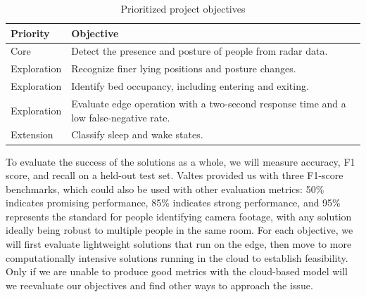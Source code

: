 \vspace{0.5em}
\begingroup
\setlength{\intextsep}{0.4em}
\begin{table}[H]
    \centering
    \captionsetup{skip=4pt,font=small}
    \caption{Prioritized project objectives}
    \footnotesize
    \renewcommand{\arraystretch}{1.05}
    \setlength{\tabcolsep}{5pt}
    \begin{tabularx}{\textwidth}{|>{\raggedright\arraybackslash}p{2.5cm}|>{\raggedright\arraybackslash}X|}
        \hline
        \textbf{Priority} & \textbf{Objective} \\ \hline
        Core & Detect the presence and posture of people from radar data. \\ \hline
        Exploration & Recognize finer lying positions and posture changes. \\ \hline
        Exploration & Identify bed occupancy, including entering and exiting. \\ \hline
        Exploration & Evaluate edge operation with a two-second response time and a low false-negative rate. \\ \hline
        Extension & Classify sleep and wake states. \\ \hline
    \end{tabularx}
\end{table}
\endgroup

To evaluate the success of the solutions as a whole, we will measure accuracy, F1 score, and recall on a held-out test set. Valtes provided us with three F1-score benchmarks, which could also be used with other evaluation metrics: 50\% indicates promising performance, 85\% indicates strong performance, and 95\% represents the standard for people identifying camera footage, with any solution ideally being robust to multiple people in the same room. For each objective, we will first evaluate lightweight solutions that run on the edge, then move to more computationally intensive solutions running in the cloud to establish feasibility. Only if we are unable to produce good metrics with the cloud-based model will we reevaluate our objectives and find other ways to approach the issue.

